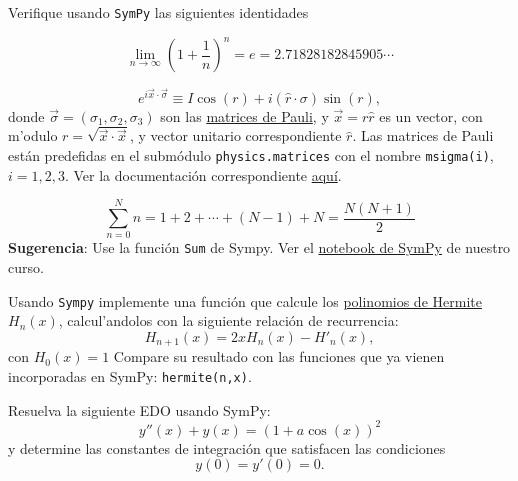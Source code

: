 \documentclass[11pt]{exam}
\begin{document}
\firstpageheadrule
\runningheadrule
{}
\cfoot{ }
\begin{flushleft}
\vspace{0.2in}

\vspace{0.25cm}
\end{flushleft}

\begin{questions}

\item Verifique usando \texttt{SymPy} las siguientes identidades
\begin{parts}
\item 
\begin{equation}
\lim_{n\to\infty}\left(1+\frac{1}{n}\right)^n = e = 2.71828182845905\cdots
\end{equation}
\item 
\begin{equation}
e^{i\vec{x}\cdot\vec{\sigma}} \equiv I\cos(r) + i(\hat{r}\cdot\sigma)\sin(r),
\end{equation}
donde $\vec\sigma = (\sigma_1,\sigma_2,\sigma_3)$ son las \href{https://es.wikipedia.org/wiki/Matrices_de_Pauli}{matrices de Pauli}, y $\vec{x}=r\hat{r}$ es un vector, con m'odulo $r = \sqrt{\vec{x}\cdot\vec{x}}$, y vector unitario correspondiente $\hat{r}$. Las matrices de Pauli están predefidas en el submódulo \texttt{physics.matrices} con el nombre \texttt{msigma(i)}, $i=1,2,3$. Ver la documentación correspondiente \href{https://docs.sympy.org/latest/modules/physics/matrices.html}{aqu\'i}.
\item 
\begin{equation}
\sum_{n=0}^N n = 1 + 2 + \cdots + (N-1) + N = \frac{N(N+1)}{2}
\end{equation}
\textbf{Sugerencia}: Use la función \texttt{Sum} de Sympy. Ver el \href{https://github.com/PythonUdeC/CPC19/blob/master/06-Sympy.ipynb}{notebook de SymPy} de nuestro curso.
\end{parts}

\item Usando \texttt{Sympy} implemente una función que calcule los \href{https://es.wikipedia.org/wiki/Polinomios_de_Hermite}{polinomios de Hermite} $H_n(x)$, calcul'andolos con la siguiente relación de recurrencia:
\begin{equation}
H_{n+1}(x) = 2x H_n(x) - H'_n(x),
\end{equation}
con $H_0(x)=1$
Compare su resultado con las funciones que ya vienen incorporadas en SymPy: \texttt{hermite(n,x)}. 

\item Resuelva la siguiente EDO usando SymPy:
\begin{equation}
y''(x)+y(x) = (1+a\cos(x))^2
\end{equation}
y determine las constantes de integración que satisfacen las condiciones
\begin{equation}
y(0)=y'(0)=0.
\end{equation}
\end{questions}
\end{document}
